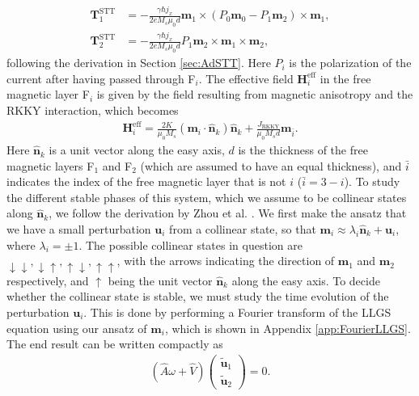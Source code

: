 \begin{subequations}
\begin{align}
    \mathbold{T}^{\text{STT}}_1 &= -\frac{\gamma \hbar j_x}{2 e M_s \mu_0 d} \mathbold{m}_1\times\left( P_0\mathbold{m}_0 - P_1 \mathbold{m}_2\right) \times \mathbold{m}_1, \\
    \mathbold{T}^{\text{STT}}_2 &= -\frac{\gamma \hbar j_x}{2 e M_s \mu_0 d} P_1 \mathbold{m}_2\times \mathbold{m}_1 \times \mathbold{m}_2,
\end{align}
\end{subequations}
following the derivation in Section \ref{sec:AdSTT}. Here $P_i$ is the polarization of the current after having passed through F$_i$. The effective field $\mathbold{H}^{\text{eff}}_i$ in the free magnetic layer F$_i$ is given by the field resulting from magnetic anisotropy and the RKKY interaction, which becomes
\begin{align}
    \mathbold{H}^{\text{eff}}_i = \frac{2K}{\mu_0 M_s}\left( \mathbold{m}_i \cdot \mathbold{\hat{n}}_k\right)\mathbold{\hat{n}}_k + \frac{J_{\text{RKKY}}}{\mu_0 M_s d} \mathbold{m}_{\bar{i}}.
\end{align}
Here $\mathbold{\hat{n}}_k$ is a unit vector along the easy axis, $d$ is the thickness of the free magnetic layers F$_1$ and F$_2$ (which are assumed to have an equal thickness), and $\bar{i}$ indicates the index of the free magnetic layer that is not $i$ ($\bar{i} = 3 - i$). To study the different stable phases of this system, which we assume to be collinear states along $\mathbold{\hat{n}}_k$, we follow the derivation by Zhou et al. \cite{Zhou2013}. We first make the ansatz that we have a small perturbation $\mathbold{u}_i$ from a collinear state, so that $\mathbold{m}_i \approx \lambda_i\mathbold{\hat{n}}_k + \mathbold{u}_i$, where $\lambda_i = \pm 1$. The possible collinear states in question are $\downarrow\downarrow, \downarrow\uparrow, \uparrow\downarrow, \uparrow\uparrow$, with the arrows indicating the direction of $\mathbold{m}_1$ and $\mathbold{m}_2$ respectively, and $\uparrow$ being the unit vector $\mathbold{\hat{n}}_k$ along the easy axis. To decide whether the collinear state is stable, we must study the time evolution of the perturbation $\mathbold{u}_i$. This is done by performing a Fourier transform of the LLGS equation using our ansatz of $\mathbold{m}_i$, which is shown in Appendix \ref{app:FourierLLGS}. The end result can be written compactly as
\begin{align}
    \label{eq:EigenvalueEqn}
    \left(\hat{A}\omega + \hat{V}\right)
    \begin{pmatrix}
     \tilde{\mathbold{u}}_1 \\
     \tilde{\mathbold{u}}_2
    \end{pmatrix}
    = 0.
\end{align}
